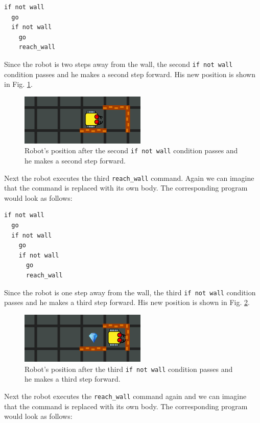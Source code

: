\documentclass[article,A4,12pt]{llncs}
\begin{document}
{{{{\begin{verbatim}
if not wall
  go
  if not wall
    go
    reach_wall
\end{verbatim}
\noindent
Since the robot is two steps away from the wall, the second {\tt if not wall} condition passes and 
he makes a second step forward. His new position is shown in Fig. \ref{fig:rec3}.

\begin{figure}[!ht]
\begin{center}
\includegraphics[width=6cm]{img/rec-3.png}
\end{center}
\vspace{-4mm}
\caption{Robot's position after the second {\tt if not wall} condition passes and he makes a second step forward.}
\label{fig:rec3}
\end{figure}
\noindent
Next the robot executes the third {\tt reach\_wall} command. Again we can imagine that the command 
is replaced with its own body. The corresponding program would look as follows:

\begin{verbatim}
if not wall
  go
  if not wall
    go
    if not wall
      go
      reach_wall
\end{verbatim}
\noindent
Since the robot is one step away from the wall, the third {\tt if not wall} condition passes and 
he makes a third step forward. His new position is shown in Fig. \ref{fig:rec4}.

\newpage
\begin{figure}[!ht]
\begin{center}
\includegraphics[width=6cm]{img/rec-4.png}
\end{center}
\vspace{-4mm}
\caption{Robot's position after the third {\tt if not wall} condition passes and he makes a third step forward.}
\label{fig:rec4}
\end{figure}
\noindent
Next the robot executes the {\tt reach\_wall} command again and we can imagine that the command 
is replaced with its own body. The corresponding program would look as follows:

}}}}
\end{document}
